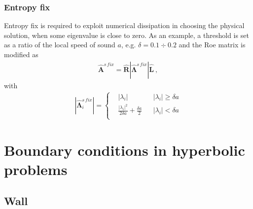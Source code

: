 \documentclass[letterpaper,10pt,english]{jupyterBook}
\begin{document}
\subsubsection{Entropy fix}
\label{\detokenize{ch/pde/fvm-hyperbolic-pde:entropy-fix}}\label{\detokenize{ch/pde/fvm-hyperbolic-pde:pde-fvm-hyperbolic-flux-entropy-fix}}
\sphinxAtStartPar
Entropy fix is required to exploit numerical dissipation in choosing the physical solution, when some eigenvalue is close to zero. As an example, a threshold is set as a ratio of the local speed of sound \(a\), e.g. \(\delta = 0.1 \div 0.2\) and the Roe matrix is modified as
\begin{equation*}
\begin{split}\hat{\mathbf{A}}^{s\, fix} = \hat{\mathbf{R}} \left| \hat{\boldsymbol{\Lambda}}^{s\, fix} \right| \hat{\mathbf{L}} \ ,\end{split}
\end{equation*}
\sphinxAtStartPar
with
\begin{equation*}
\begin{split}
\left| \hat{\boldsymbol{\Lambda}}^{s\, fix}_{i} \right| = 
\left\{\begin{aligned} 
  & |\lambda_i| && |\lambda_i| \ge \delta a \\
  & \frac{|\lambda_i|^2}{2 \delta a} + \frac{\delta a}{2} && |\lambda_i| < \delta a \\
\end{aligned}\right.
\end{split}
\end{equation*}
\sphinxAtStartPar
{}   

\sphinxstepscope


\section{Boundary conditions in hyperbolic problems}
\label{\detokenize{ch/pde/fvm-hyperbolic-bc:boundary-conditions-in-hyperbolic-problems}}\label{\detokenize{ch/pde/fvm-hyperbolic-bc:pde-fvm-hyperbolic-bc}}\label{\detokenize{ch/pde/fvm-hyperbolic-bc::doc}}

\subsection{Wall}
\label{\detokenize{ch/pde/fvm-hyperbolic-bc:wall}}\label{\detokenize{ch/pde/fvm-hyperbolic-bc:pde-fvm-hyperbolic-bc-wall}}
\end{document}
